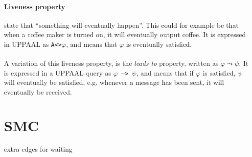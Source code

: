 \paragraph{Liveness property} state that ``something will eventually happen''. This could for example be that when a coffee maker is turned on, it will eventually output coffee. It is expressed in UPPAAL as \texttt{A<>$\varphi$}, and means that $\varphi$ is eventually satisfied.\\\\
A variation of this liveness property, is the \textit{leads to} property, written as $\varphi \leadsto \psi$. It is expressed in a UPPAAL query as \texttt{$\varphi$ --> $\psi$}, and means that if $\varphi$ is satisfied, $\psi$ will eventually be satisfied, e.g. whenever a message has been sent, it will eventually be received.
\section{SMC}
extra edges for waiting